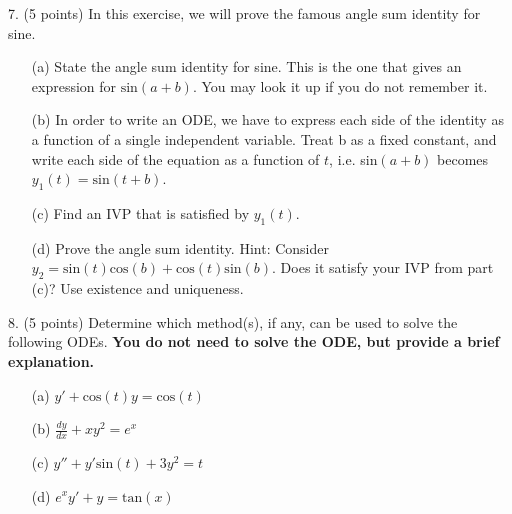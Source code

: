 \documentclass[12pt,letterpaper]{hmcpset}
\begin{document}
\begin{problem}
7. (5 points) In this exercise, we will prove the famous angle sum identity for sine.

\begin{enumerate}
    \item[(a)] State the angle sum identity for sine. This is the one that gives an expression for
$\text{sin}(a + b)$. You may look it up if you do not remember it.
    \item[(b)] In order to write an ODE, we have to express each side of the identity as a function of
a single independent variable. Treat b as a fixed constant, and write each side of the
equation as a function of $t$, i.e. sin$(a + b)$ becomes $y_1(t) = \text{sin}(t + b)$.
    \item[(c)] Find an IVP that is satisfied by $y_1(t)$.
    \item[(d)] Prove the angle sum identity. Hint: Consider $y_2 = \text{sin}(t) \text{cos} (b)+ \text{cos}(t)\text{sin}(b)$. Does it satisfy
your IVP from part (c)? Use existence and uniqueness.
\end{enumerate}
\end{problem}
\newpage

\begin{problem}
8. (5 points) Determine which method(s), if any, can be used to solve the following ODEs. \textbf{You
do not need to solve the ODE, but provide a brief explanation.}

\begin{enumerate}
    \item[(a)] $y' + \text{cos}(t)y = \text{cos}(t)$
    \item[(b)] $\frac{dy}{dx}+ xy^2 = e^x$
    \item[(c)]$y''+ y'\text{sin}(t) + 3y^2 = t$
    \item[(d)]$e^xy' + y = \text{tan}(x)$
\end{enumerate}
\end{problem}
\newpage

\end{document}
